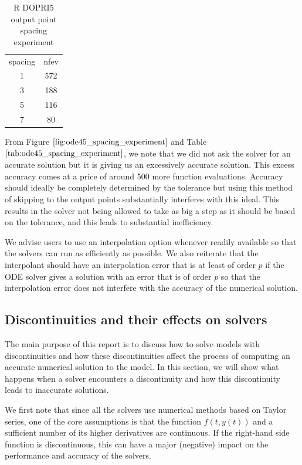 \begin{table}[h]
\caption {R DOPRI5 output point spacing experiment} \label{tab:ode45_spacing_experiment} 
\begin{center}
\begin{tabular}{ c c }
spacing & nfev \\ 
1 & 572 \\
3 & 188 \\
5 & 116 \\
7 & 80 \\
\end{tabular}
\end{center}
\end{table}

From Figure $\ref{fig:ode45_spacing_experiment}$ and Table $\ref{tab:ode45_spacing_experiment}$, we note that we did not ask the solver for an accurate solution but it is giving us an excessively accurate solution. This excess accuracy comes at a price of around 500 more function evaluations. Accuracy should ideally be completely determined by the tolerance but using this method of skipping to the output points substantially interferes with this ideal. This results in the solver not being allowed to take as big a step as it should be based on the tolerance, and this leads to substantial inefficiency. 

We advise users to use an interpolation option whenever readily available so that the solvers can run as efficiently as possible. We also reiterate that the interpolant should have an interpolation error that is at least of order $p$ if the ODE solver gives a solution with an error that is of order $p$ so that the interpolation error does not interfere with the accuracy of the numerical solution.

\subsection{Discontinuities and their effects on solvers}
\label{subsection:effect_of_discontinuity}
The main purpose of this report is to discuss how to solve models with discontinuities and how these discontinuities affect the process of computing an accurate numerical solution to the model. In this section, we will show what happens when a solver encounters a discontinuity and how this discontinuity leads to inaccurate solutions.

We first note that since all the solvers use numerical methods based on Taylor series, one of the core assumptions is that the function $f(t, y(t))$ and a sufficient number of its higher derivatives are continuous. If the right-hand side function is discontinuous, this can have a major (negative) impact on the performance and accuracy of the solvers. 


